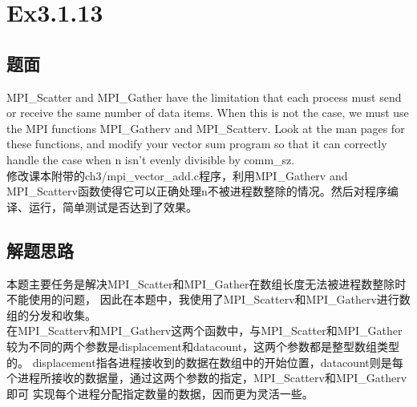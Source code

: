 \documentclass[UTF8]{article}
\begin{document}






\newpage


\section{Ex3.1.13}
\subsection{题面}
MPI\_Scatter and MPI\_Gather have the limitation that each process must send or receive the same number of data items. When this is not the case, we must use the MPI functions MPI\_Gatherv and MPI\_Scatterv. Look at the man pages for these functions, and modify your vector sum program so that it can correctly handle the case when n isn’t evenly divisible by comm\_sz.\\


修改课本附带的ch3/mpi\_vector\_add.c程序，利用MPI\_Gatherv and MPI\_Scatterv函数使得它可以正确处理n不被进程数整除的情况。然后对程序编译、运行，简单测试是否达到了效果。
\subsection{解题思路}
本题主要任务是解决MPI\_Scatter和MPI\_Gather在数组长度无法被进程数整除时不能使用的问题，
因此在本题中，我使用了MPI\_Scatterv和MPI\_Gatherv进行数组的分发和收集。\\


在MPI\_Scatterv和MPI\_Gatherv这两个函数中，与MPI\_Scatter和MPI\_Gather较为不同的两个参数是displacement和datacount，这两个参数都是整型数组类型的。
displacement指各进程接收到的数据在数组中的开始位置，datacount则是每个进程所接收的数据量，通过这两个参数的指定，MPI\_Scatterv和MPI\_Gatherv即可
实现每个进程分配指定数量的数据，因而更为灵活一些。 \\
\end{document}
